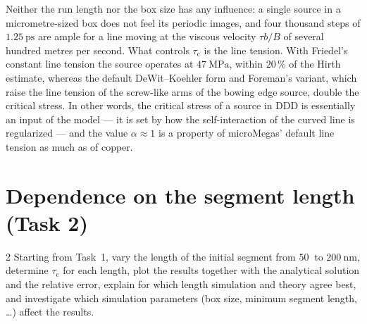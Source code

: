 \documentclass[11pt,a4paper]{article}
\numberwithin{equation}{section}
\theoremstyle{remark}
\newcommand{\tauc}{\tau_{\mathrm{c}}}
\begin{document}
Neither the run length nor the box size has any influence: a single source in a micrometre-sized box
does not feel its periodic images, and four thousand steps of $\SI{1.25}{\pico\second}$ are ample for a
line moving at the viscous velocity $\tau b/B$ of several hundred metres per second. What controls
$\tauc$ is the line tension. With Friedel's constant line tension the source operates at
$\SI{47}{\mega\pascal}$, within $20\,\%$ of the Hirth estimate, whereas the default DeWit--Koehler form and
Foreman's variant, which raise the line tension of the screw-like arms of the bowing edge source, double
the critical stress. In other words, the critical stress of a source in DDD is essentially an input of
the model --- it is set by how the self-interaction of the curved line is regularized --- and the value
$\alpha \approx 1$ is a property of microMegas' default line tension as much as of copper.

\section{Dependence on the segment length (Task 2)}\label{sec:task2}

\begin{task}{2}
  Starting from Task~1, vary the length of the initial segment from $\SI{50}{}$ to
  $\SI{200}{\nano\metre}$, determine $\tauc$ for each length, plot the results together with the
  analytical solution and the relative error, explain for which length simulation and theory agree
  best, and investigate which simulation parameters (box size, minimum segment length, \dots) affect the
  results.
\end{task}
\end{document}
